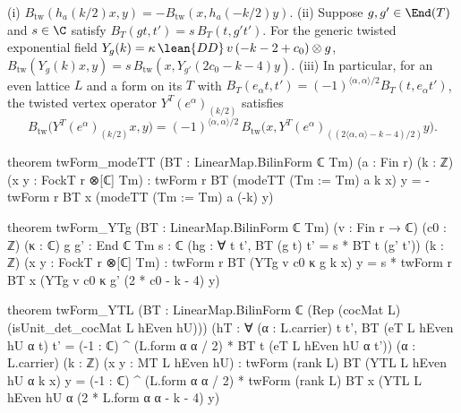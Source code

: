 \begin{theorem}\label{ch09:thm:twadj}
\textup{(i)} $B_{\mathrm{tw}}(h_a(k/2)x,y)=-B_{\mathrm{tw}}(x,h_a(-k/2)y)$.
\textup{(ii)} Suppose $g,g'\in\End(T)$ and $s\in\C$ satisfy $B_T(gt,t')=s\,B_T(t,g't')$. For the
generic twisted exponential field $Y_g(k)=\kappa\,\lean{DD}\,v\,(-k-2+c_0)\otimes g$,
$B_{\mathrm{tw}}(Y_g(k)x,y)=s\,B_{\mathrm{tw}}(x,Y_{g'}(2c_0-k-4)y)$.
\textup{(iii)} In particular, for an even lattice $L$ and a form on its $T$ with
$B_T(e_\alpha t,t')=(-1)^{\langle\alpha,\alpha\rangle/2}B_T(t,e_\alpha t')$, the twisted vertex
operator $Y^T(e^\alpha)_{(k/2)}$ satisfies
\begin{equation}\label{ch09:eq:YTLadj}
B_{\mathrm{tw}}\big(Y^T(e^\alpha)_{(k/2)}x,y\big)=(-1)^{\langle\alpha,\alpha\rangle/2}\,
B_{\mathrm{tw}}\big(x,Y^T(e^\alpha)_{((2\langle\alpha,\alpha\rangle-k-4)/2)}y\big).
\end{equation}
\end{theorem}
\begin{leancode}
theorem twForm_modeTT (BT : LinearMap.BilinForm ℂ Tm) (a : Fin r) (k : ℤ)
    (x y : FockT r ⊗[ℂ] Tm) :
    twForm r BT (modeTT (Tm := Tm) a k x) y = -twForm r BT x (modeTT (Tm := Tm) a (-k) y)

theorem twForm_YTg (BT : LinearMap.BilinForm ℂ Tm) (v : Fin r → ℂ) (c0 : ℤ) (κ : ℂ)
    {g g' : End ℂ Tm} {s : ℂ} (hg : ∀ t t', BT (g t) t' = s * BT t (g' t')) (k : ℤ)
    (x y : FockT r ⊗[ℂ] Tm) :
    twForm r BT (YTg v c0 κ g k x) y = s * twForm r BT x (YTg v c0 κ g' (2 * c0 - k - 4) y)

theorem twForm_YTL (BT : LinearMap.BilinForm ℂ (Rep (cocMat L) (isUnit_det_cocMat L hEven hU)))
    (hT : ∀ (α : L.carrier) t t', BT (eT L hEven hU α t) t'
      = (-1 : ℂ) ^ (L.form α α / 2) * BT t (eT L hEven hU α t'))
    (α : L.carrier) (k : ℤ) (x y : MT L hEven hU) :
    twForm (rank L) BT (YTL L hEven hU α k x) y
      = (-1 : ℂ) ^ (L.form α α / 2) *
          twForm (rank L) BT x (YTL L hEven hU α (2 * L.form α α - k - 4) y)
\end{leancode}
